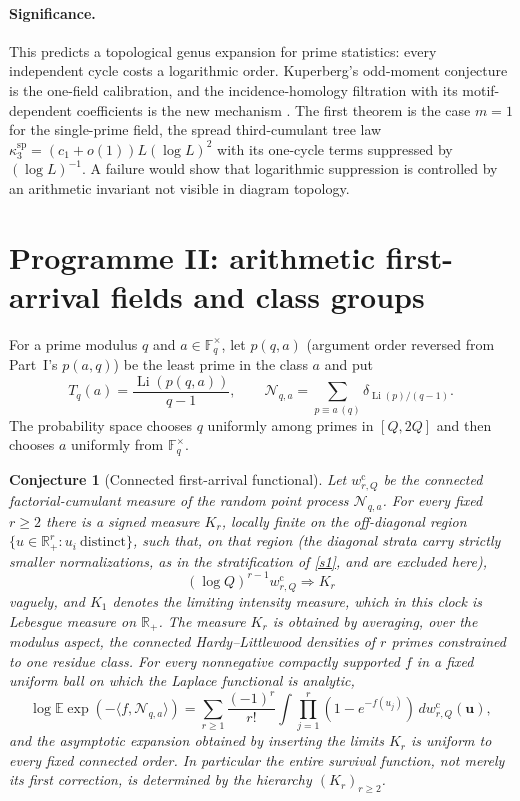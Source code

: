 \documentclass[11pt]{article}
\newtheorem{conjecture}{Conjecture}
\theoremstyle{definition}
\newcommand{\Li}{\operatorname{Li}}
\newcommand{\E}{\mathbb E}
\newcommand{\Fq}{\mathbb F}
\newcommand{\R}{\mathbb R}
\providecommand{\R}{\mathbb R}
\providecommand{\E}{\mathbb E}
\begin{document}
\paragraph{Significance.}
This predicts a topological genus expansion for prime statistics: every independent
cycle costs a logarithmic order.  Kuperberg's odd-moment conjecture is the one-field
calibration, and the incidence-homology filtration with its motif-dependent coefficients is the new mechanism \cite{Kuperberg}. The first theorem is the case $m=1$ for the single-prime field, the spread third-cumulant tree law $\kappa^{\mathrm{sp}}_{3}=(c_1+o(1))L(\log L)^{2}$ with its one-cycle terms suppressed by $(\log L)^{-1}$.  A failure would show that logarithmic suppression
is controlled by an arithmetic invariant not visible in diagram topology.

\section{Programme II: arithmetic first-arrival fields and class groups}

For a prime modulus $q$ and $a\in\Fq_q^\times$, let $p(q,a)$ (argument order reversed from Part~I's $p(a,q)$) be the least prime in the
class $a$ and put
\[
 T_q(a)=\frac{\Li(p(q,a))}{q-1},\qquad
 \mathcal N_{q,a}=\sum_{p\equiv a\, (q)}
 \delta_{\Li(p)/(q-1)}.
\]
The probability space chooses $q$ uniformly among primes in $[Q,2Q]$ and then chooses
$a$ uniformly from $\Fq_q^\times$.

\begin{conjecture}[Connected first-arrival functional]\label{s6}
Let $w^{\mathrm c}_{r,Q}$ be the connected factorial-cumulant measure of the random point
process $\mathcal N_{q,a}$.  For every fixed $r\ge2$ there is a signed measure $K_r$, locally finite on the off-diagonal region $\{u\in\R_+^r:u_i\ \text{distinct}\}$, such that, on that region (the diagonal strata carry strictly smaller normalizations, as in the stratification of \cref{s1}, and are excluded here),
\[
 (\log Q)^{r-1}w^{\mathrm c}_{r,Q}\Longrightarrow K_r
\]
vaguely, and $K_1$ denotes the limiting intensity measure, which in this clock is
Lebesgue measure on $\R_+$.  The measure $K_r$ is obtained by averaging, over the
modulus aspect, the connected Hardy--Littlewood densities of $r$ primes constrained to
one residue class.  For every nonnegative compactly supported $f$ in a fixed uniform ball on which the
Laplace functional is analytic,
\[
 \log\E\exp(-\langle f,\mathcal N_{q,a}\rangle)
 =\sum_{r\ge1}\frac{(-1)^r}{r!}
 \int\prod_{j=1}^r(1-e^{-f(u_j)})\,dw^{\mathrm c}_{r,Q}(\mathbf u),
\]
and the asymptotic expansion obtained by inserting the limits $K_r$ is uniform to every
fixed connected order.  In particular the entire survival function, not merely its
first correction, is determined by the hierarchy $(K_r)_{r\ge2}$.
\end{conjecture}
\end{document}
